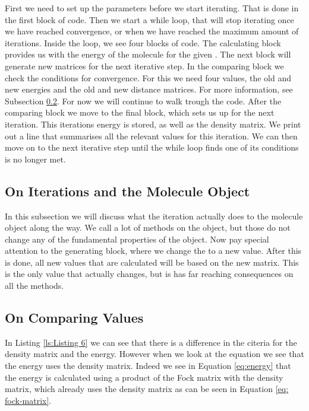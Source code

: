 First we need to set up the parameters before we start iterating. That is done in 
the first block of code. Then we start a while loop, that will stop iterating once
we have reached convergence, or when we have reached the maximum amount of 
iterations. Inside the loop, we see four blocks of code. The calculating block 
provides us with the energy of the molecule for the given 
. The next block will generate new matrices for 
the next iterative step. In the comparing block we check the conditions for 
convergence. For this we need four values, the old and new energies and the old 
and new distance matrices. For more information, see Subsection 
\ref{subsec:step6.1}. For now we will continue to walk trough the code. 
After the comparing block we move to the final block, which sets us up for the 
next iteration. This iterations energy is stored, as well as the density matrix. 
We print out a line that summarises all the relevant values for this iteration. 
We can then move on to the next iterative step until the while loop finds one of 
its conditions is no longer met.

\subsection{On Iterations and the Molecule Object}
\label{subsec: iteration}
In this subsection we will discuss what the iteration actually does to the 
molecule object along the way. We call a lot of methods on the object, but those 
do not change any of the fundamental properties of the object. Now pay special
attention to the generating block, where we change the 
 to a new value. After this is done, all new values
that are calculated will be based on the new matrix. This is the only value that 
actually changes, but is has far reaching consequences on all the methods. 

 
 \subsection{On Comparing Values}
 \label{subsec:step6.1}
In Listing \ref{ls:Listing 6} we can see that there is a difference in the
citeria for the density matrix and the energy. However when we look at the 
equation we see that the energy uses the density matrix. Indeed we see in 
Equation \ref{eq:energy} that the energy is calculated using a 
product of the Fock matrix with the density matrix, which already uses the density
matrix as can be seen in Equation \ref{eq: fock-matrix}.
 
